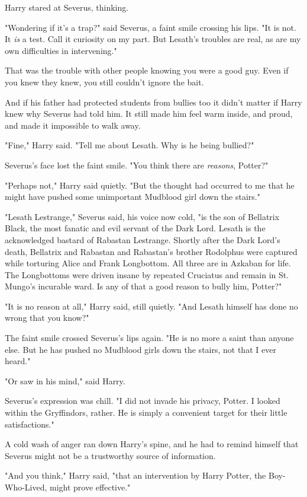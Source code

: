 Harry stared at Severus, thinking.

"Wondering if it's a trap?" said Severus, a faint smile crossing his lips. "It
is not. It \emph{is} a test. Call it curiosity on my part. But Lesath's
troubles are real, as are my own difficulties in intervening."

That was the trouble with other people knowing you were a good guy. Even if you
knew they knew, you still couldn't ignore the bait.

And if his father had protected students from bullies too{\el} it didn't
matter if Harry knew why Severus had told him. It still made him feel warm
inside, and proud, and made it impossible to walk away.

"Fine," Harry said. "Tell me about Lesath. Why is he being bullied?"

Severus's face lost the faint smile. "You think there are \emph{reasons},
Potter?"

"Perhaps not," Harry said quietly. "But the thought had occurred to me that he
might have pushed some unimportant Mudblood girl down the stairs."

"Lesath Lestrange," Severus said, his voice now cold, "is the son of Bellatrix
Black, the most fanatic and evil servant of the Dark Lord. Lesath is the
acknowledged bastard of Rabastan Lestrange. Shortly after the Dark Lord's
death, Bellatrix and Rabastan and Rabastan's brother Rodolphus were captured
while torturing Alice and Frank Longbottom. All three are in Azkaban for life.
The Longbottoms were driven insane by repeated Cruciatus and remain in St.
Mungo's incurable ward. Is any of that a good reason to bully him, Potter?"

"It is no reason at all," Harry said, still quietly. "And Lesath himself has
done no wrong that you know?"

The faint smile crossed Severus's lips again. "He is no more a saint than
anyone else. But he has pushed no Mudblood girls down the stairs, not that I
ever heard."

"Or saw in his mind," said Harry.

Severus's expression was chill. "I did not invade his privacy, Potter. I looked
within the Gryffindors, rather. He is simply a convenient target for their
little satisfactions."

A cold wash of anger ran down Harry's spine, and he had to remind himself that
Severus might not be a trustworthy source of information.

"And you think," Harry said, "that an intervention by Harry Potter, the
Boy-Who-Lived, might prove effective."

